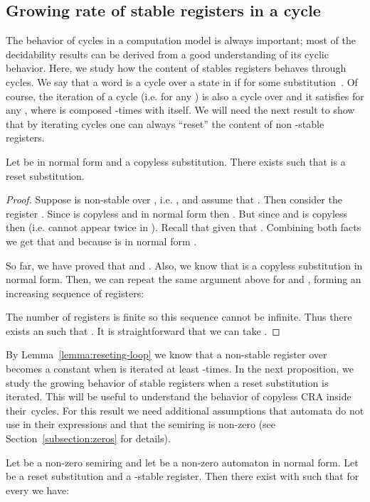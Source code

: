 \subsection{Growing rate of stable registers in a cycle}
The behavior of cycles in a computation model is always important; most of the decidability results can be derived from a good understanding of its cyclic behavior. 
Here, we study how the content of stables registers behaves through cycles.
We say that a word  is a cycle over a state  in  if  for some substitution~. 
Of course, the iteration of a cycle  (i.e.  for any ) is also a cycle over  and it satisfies  for any , where  is  composed -times with itself. 
We will need the next result to show that by iterating cycles one can always ``reset'' the content of non -stable registers.  
\begin{lemma} \label{lemma:reseting-loop}
Let  be in normal form and  a copyless substitution. There exists  such that  is a reset substitution. 
\end{lemma}

\begin{proof}
Suppose  is non-stable over , i.e. , and assume that . Then consider the register . Since  is copyless and in normal form then . But since  and  is copyless then  (i.e.  cannot appear twice in ). 
Recall that  given that .
Combining both facts we get that  and because  is in normal form . 

So far, we have proved that  and . Also, we know that  is a copyless substitution in normal form. Then, we can repeat the same argument above for  and , forming an increasing sequence of registers:

The number of registers is finite so this sequence cannot be infinite. Thus there exists an  such that .
It is straightforward that we can take .
\end{proof}
By Lemma~\ref{lemma:reseting-loop} we know that a non-stable register  over  becomes a constant when  is iterated at least -times.
In the next proposition, we study the growing behavior of stable registers when a reset substitution is iterated. This will be useful to understand the behavior of copyless CRA inside their~cycles.
For this result we need additional assumptions that automata do not use  in their expressions and that the semiring  is non-zero (see Section~\ref{subsection:zeros} for details).
\begin{proposition}
	\label{prop:long_exp}
	Let  be a non-zero semiring and let  be a non-zero automaton
	in normal form. Let  be a reset substitution and  a -stable register. Then there exist  with  such that for every  we have:
	
\end{proposition}

